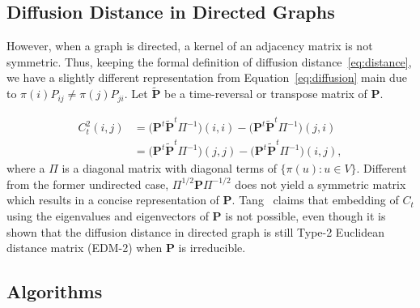 \documentclass[11pt]{article}
\theoremstyle{definition}
\begin{document}
\subsection{Diffusion Distance in Directed Graphs}
\label{ssec:directed}

However, when a graph is directed, a kernel of an adjacency matrix is not symmetric. Thus, keeping the formal definition of diffusion distance~\ref{eq:distance}, we have a slightly different representation from Equation~\ref{eq:diffusion} main due to $\pi(i) P_{ij} \neq \pi(j) P_{ji}$. Let $\tilde{\mathbf{P}}$ be a time-reversal or transpose matrix of $\mathbf{P}$.

\begin{equation}
\begin{split}
\label{eq:directed}
C^2_{t}(i,j)  & = \big( \mathbf{P}^{t} \tilde{ \mathbf{P} }^{t} \Pi^{-1} \big)(i,i) - \big( \mathbf{P}^{t} \tilde{ \mathbf{P} }^{t} \Pi^{-1} \big)(j,i) \\ & = \big( \mathbf{P}^{t} \tilde{ \mathbf{P} }^{t} \Pi^{-1} \big)(j,j) - \big( \mathbf{P}^{t} \tilde{ \mathbf{P}}^{t} \Pi^{-1} \big) (i,j),
\end{split}  
\end{equation}
where a $\Pi$ is a diagonal matrix with diagonal terms of $\{ \pi(u) : u \in V \}$. 
Different from the former undirected case, $\Pi^{1/2} \mathbf{P} \Pi^{-1/2}$ does not yield a symmetric matrix which results in a concise representation of $\mathbf{P}$. Tang~\cite{tang2010graph} claims that embedding of $C_{t}$ using the eigenvalues and eigenvectors of $\mathbf{P}$ is not possible, even though it is shown that the diffusion distance in directed graph is still Type-2 Euclidean distance matrix (EDM-2) when $\mathbf{P}$ is irreducible. 
\subsection{Algorithms}
\end{document}
